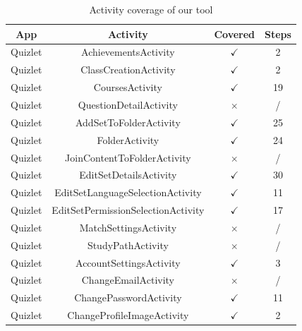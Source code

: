 \documentclass[conference]{IEEEtran}
\begin{document}
\begin{table}
    \centering
    \caption{Activity coverage of our tool}
    \label{tab:our_covered}
    \begin{tabular}{|c|c|c|c|}
    \hline
    \textbf{App} & \textbf{Activity}             & \textbf{Covered} & \textbf{Steps} \\ \hline
    Quizlet           & AchievementsActivity               & $\checkmark$       & 2              \\ \hline
    Quizlet           & ClassCreationActivity              & $\checkmark$       & 2              \\ \hline
    Quizlet           & CoursesActivity                    & $\checkmark$       & 19             \\ \hline
    Quizlet           & QuestionDetailActivity             & $\times$           & /              \\ \hline
    Quizlet           & AddSetToFolderActivity             & $\checkmark$       & 25             \\ \hline
    Quizlet           & FolderActivity                     & $\checkmark$       & 24             \\ \hline
    Quizlet           & JoinContentToFolderActivity        & $\times$           & /              \\ \hline
    Quizlet           & EditSetDetailsActivity             & $\checkmark$       & 30             \\ \hline
    Quizlet           & EditSetLanguageSelectionActivity   & $\checkmark$       & 11             \\ \hline
    Quizlet           & EditSetPermissionSelectionActivity & $\checkmark$       & 17             \\ \hline
    Quizlet           & MatchSettingsActivity              & $\times$           & /              \\ \hline
    Quizlet           & StudyPathActivity                  & $\times$           & /              \\ \hline
    Quizlet           & AccountSettingsActivity            & $\checkmark$       & 3              \\ \hline
    Quizlet           & ChangeEmailActivity                & $\times$           & /              \\ \hline
    Quizlet           & ChangePasswordActivity             & $\checkmark$       & 11             \\ \hline
    Quizlet           & ChangeProfileImageActivity         & $\checkmark$       & 2              \\ \hline

\end{tabular}
\end{table}
\end{document}
